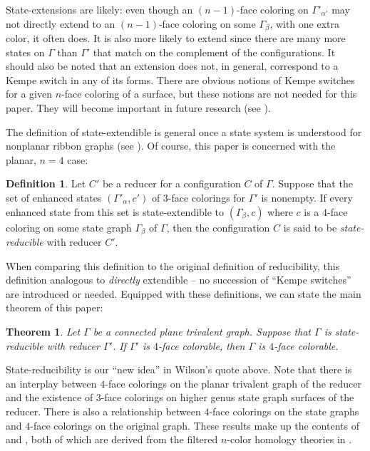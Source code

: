 \documentclass[12pt]{amsart}
\newtheorem{Theorem}{Theorem}
\theoremstyle{definition}
\newtheorem{definition}[theorem]{Definition}
\theoremstyle{remark}
\numberwithin{equation}{section}
\begin{document}
State-extensions are likely: even though an $(n-1)$-face coloring on $\Gamma
'_{\alpha'}$ may not directly extend to an $(n-1)$-face coloring on some $\Gamma_\beta$, with one extra color, it often does.  It is also more likely to extend since there are many more states on $\Gamma$ than $\Gamma'$ that match on the complement of the configurations. It should also be noted that an extension does not, in general, correspond to a Kempe switch in any of its forms. There are obvious notions of Kempe switches for a given $n$-face coloring of a surface, but these notions are not needed for this paper. They will become important in future research (see ).

The definition of state-extendible is general once a state system is understood for nonplanar ribbon graphs (see \cite{BMcC}). Of course, this paper is concerned with the planar, $n=4$ case:

\begin{definition}
Let $C'$ be a reducer for a configuration $C$ of $\Gamma$. Suppose that the set of enhanced states $(\Gamma'_\alpha,c')$ of $3$-face colorings for $\Gamma'$ is nonempty. If every enhanced state from this set is state-extendible to $(\Gamma_\beta, c)$ where $c$ is a  $4$-face coloring on some state graph $\Gamma_\beta$ of $\Gamma$, then the configuration $C$ is said to be {\em state-reducible} with reducer $C'$.
\end{definition}

When comparing this definition to the original definition of reducibility, this definition analogous to  {\em directly} extendible -- no succession of ``Kempe switches'' are introduced or needed. Equipped with these definitions, we can state the main theorem of this paper:

\medskip
\begin{Theorem} \label{Theorem:State-Reducible}
Let $\Gamma$ be a connected plane trivalent graph. Suppose that $\Gamma$ is state-reducible with reducer $\Gamma'$. If $\Gamma'$ is $4$-face colorable, then $\Gamma$ is $4$-face colorable.
\end{Theorem}
\medskip

State-reducibility is our ``new idea'' in Wilson's quote above.  Note that there is an interplay between $4$-face colorings on the planar trivalent graph of the reducer and the existence of $3$-face colorings on higher genus state graph surfaces of the reducer. There is also a relationship between $4$-face colorings on the state graphs and $4$-face colorings on the original graph. These results make up the contents of  and , both of which are derived from the filtered $n$-color homology theories in \cite{BMcC}. 
\end{document}
